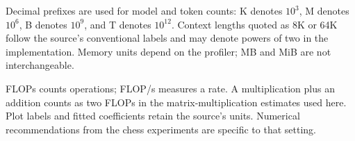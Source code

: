 \documentclass[11pt,a4paper,oneside]{report}
\begin{document}
\medskip
Decimal prefixes are used for model and token counts: K denotes $10^3$, M denotes $10^6$, B denotes $10^9$, and T denotes $10^{12}$. Context lengths quoted as 8K or 64K follow the source's conventional labels and may denote powers of two in the implementation. Memory units depend on the profiler; MB and MiB are not interchangeable.

FLOPs counts operations; FLOP/s measures a rate. A multiplication plus an addition counts as two FLOPs in the matrix-multiplication estimates used here. Plot labels and fitted coefficients retain the source's units. Numerical recommendations from the chess experiments are specific to that setting.

\tableofcontents
\clearpage
{}











\appendix


\clearpage
{}
{}


\end{document}
